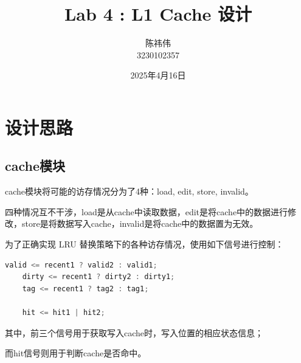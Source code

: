 \documentclass{article}
\author{陈祎伟\\3230102357}
\title{Lab 4 : L1 Cache 设计}
\date{2025年4月16日}
\begin{document}
\maketitle
\section{设计思路}
\subsection{cache模块}
cache模块将可能的访存情况分为了4种：load, edit, store, invalid。\par
四种情况互不干涉，load是从cache中读取数据，edit是将cache中的数据进行修改，store是将数据写入cache，invalid是将cache中的数据置为无效。\par
为了正确实现 LRU 替换策略下的各种访存情况，使用如下信号进行控制：\par
    \begin{lstlisting}[language=Verilog]
    valid <= recent1 ? valid2 : valid1;
    dirty <= recent1 ? dirty2 : dirty1;
    tag <= recent1 ? tag2 : tag1;

    hit <= hit1 | hit2; 
    \end{lstlisting}

其中，前三个信号用于获取写入cache时，写入位置的相应状态信息；\par
而hit信号则用于判断cache是否命中。\par
\end{document}

